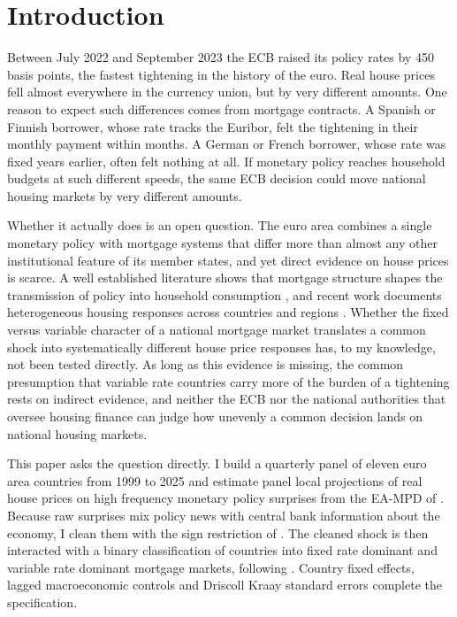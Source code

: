 \section{Introduction}
\label{sec:intro}

Between July 2022 and September 2023 the ECB raised its policy rates by 450
basis points, the fastest tightening in the history of the euro. Real house
prices fell almost everywhere in the currency union, but by very different
amounts. One reason to expect such differences comes from mortgage
contracts. A Spanish or Finnish borrower, whose rate tracks the Euribor,
felt the tightening in their monthly payment within months. A German or
French borrower, whose rate was fixed years earlier, often felt nothing at
all. If monetary policy reaches household budgets at such different speeds,
the same ECB decision could move national housing markets by very
different amounts.

Whether it actually does is an open question. The euro area combines a
single monetary policy with mortgage systems that differ more than almost
any other institutional feature of its member states, and yet direct
evidence on house prices is scarce. A well established literature shows
that mortgage structure shapes the transmission of policy into household
consumption \citep{calza2013, dimaggio2017, cloyne2020}, and recent work
documents heterogeneous housing responses across countries and regions
\citep{corsetti2022, battistini2025}. Whether the fixed versus variable
character of a national mortgage market translates a common shock into
systematically different house price responses has, to my knowledge, not
been tested directly. As long as this evidence is missing, the common
presumption that variable rate countries carry more of the burden of a
tightening rests on indirect evidence, and neither the ECB nor the
national authorities that oversee housing finance can judge how unevenly a
common decision lands on national housing markets.

This paper asks the question directly. I build a quarterly panel of eleven
euro area countries from 1999 to 2025 and estimate panel local projections
\citep{jorda2005} of real house prices on high frequency monetary policy
surprises from the EA-MPD of \citet{altavilla2019}. Because raw surprises
mix policy news with central bank information about the economy, I clean
them with the sign restriction of \citet{jarocinski2020}. The cleaned shock
is then interacted with a binary classification of countries into fixed
rate dominant and variable rate dominant mortgage markets, following
\citet{badarinza2018}. Country fixed effects, lagged macroeconomic controls
and Driscoll Kraay standard errors complete the specification.

